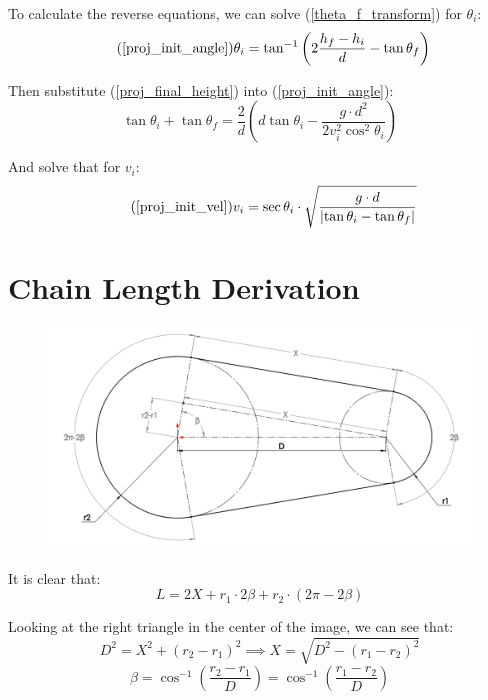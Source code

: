\documentclass[11pt,a4paper,titlepage]{article}
\begin{document}
	To calculate the reverse equations, we can solve (\ref{theta_f_transform}) for $\theta_i$:
	\begin{equation} \tag{\ref*{proj_init_angle}}
		\theta_i = \tan^{-1} \left( 2 \frac{h_f - h_i}{d} - \tan \theta_f \right)
	\end{equation}
	
	Then substitute (\ref{proj_final_height}) into (\ref{proj_init_angle}):
	\begin{equation}
		\tan \theta_i + \tan \theta_f = \frac{2}{d} \left( d \tan \theta_i - \frac{g \cdot d^2}{2 v_i^2 \cos^2 \theta_i} \right)
	\end{equation}
	
	And solve that for $v_i$:
	\begin{equation} \tag{\ref*{proj_init_vel}}
		v_i = \sec \theta_i \cdot \sqrt{\frac{g \cdot d}{\left| \tan \theta_i - \tan \theta_f \right|}}
	\end{equation}
	
	\section{Chain Length Derivation} \label{appendixD}

	\begin{figure}[H]
		\centering
		\includegraphics[width=\linewidth]{Chain_Derivation}
	\end{figure}
	
	It is clear that:
	\begin{equation} \label{chain_L_general}
		L = 2 X + r_1 \cdot 2 \beta + r_2 \cdot (2 \pi - 2 \beta)
	\end{equation}
	
	Looking at the right triangle in the center of the image, we can see that:
	\begin{equation} \label{chain_X}
		D^2 = X^2 + (r_2 - r_1)^2 \implies X = \sqrt{D^2 - (r_1 - r_2)^2}
	\end{equation}
	\begin{equation} \label{chain_beta}
		\beta = \cos^{-1} \left( \frac{r_2 - r_1}{D} \right) = \cos^{-1} \left( \frac{r_1 - r_2}{D} \right)
	\end{equation}
	
\end{document}
